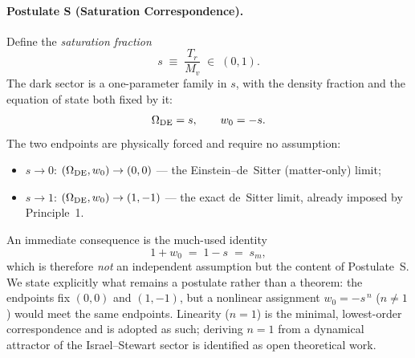 \documentclass[12pt,a4paper]{article}
\begin{document}
\paragraph{Postulate S (Saturation Correspondence).}
Define the \emph{saturation fraction}
\begin{equation}
  s \;\equiv\; \frac{T_r}{M_v} \;\in\;(0,1).
  \label{eq:sat_fraction}
\end{equation}
The dark sector is a one-parameter family in $s$, with the density fraction
and the equation of state both fixed by it:
\begin{equation}
  \Omega_{\rm DE} = s, \qquad w_0 = -s.
  \label{eq:sat_correspondence}
\end{equation}
The two endpoints are physically forced and require no assumption:
\begin{itemize}\itemsep2pt
  \item $s\to0$: $(\Omega_{\rm DE},w_0)\to(0,0)$ --- the Einstein--de~Sitter
        (matter-only) limit;
  \item $s\to1$: $(\Omega_{\rm DE},w_0)\to(1,-1)$ --- the exact de~Sitter
        limit, already imposed by Principle~1.
\end{itemize}
An immediate consequence is the much-used identity
\begin{equation}
  1 + w_0 \;=\; 1 - s \;=\; s_m,
  \label{eq:1pw0_identity}
\end{equation}
which is therefore \emph{not} an independent assumption but the content of
Postulate~S. We state explicitly what remains a postulate rather than a
theorem: the endpoints fix $(0,0)$ and $(1,-1)$, but a nonlinear assignment
$w_0=-s^{\,n}$ ($n\neq1$) would meet the same endpoints. Linearity ($n=1$) is
the minimal, lowest-order correspondence and is adopted as such; deriving
$n=1$ from a dynamical attractor of the Israel--Stewart sector is identified
as open theoretical work.
\end{document}
